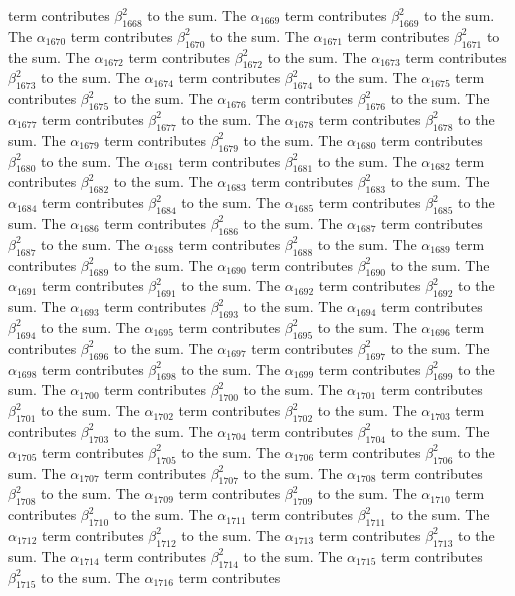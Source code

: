 \begin{lemma}
term contributes $\beta_{1668}^{2}$ to the sum. The $\alpha_{1669}$ term contributes $\beta_{1669}^{2}$ to the sum. The $\alpha_{1670}$ term contributes $\beta_{1670}^{2}$ to the sum. The $\alpha_{1671}$ term contributes $\beta_{1671}^{2}$ to the sum. The $\alpha_{1672}$ term contributes $\beta_{1672}^{2}$ to the sum. The $\alpha_{1673}$ term contributes $\beta_{1673}^{2}$ to the sum. The $\alpha_{1674}$ term contributes $\beta_{1674}^{2}$ to the sum. The $\alpha_{1675}$ term contributes $\beta_{1675}^{2}$ to the sum. The $\alpha_{1676}$ term contributes $\beta_{1676}^{2}$ to the sum. The $\alpha_{1677}$ term contributes $\beta_{1677}^{2}$ to the sum. The $\alpha_{1678}$ term contributes $\beta_{1678}^{2}$ to the sum. The $\alpha_{1679}$ term contributes $\beta_{1679}^{2}$ to the sum. The $\alpha_{1680}$ term contributes $\beta_{1680}^{2}$ to the sum. The $\alpha_{1681}$ term contributes $\beta_{1681}^{2}$ to the sum. The $\alpha_{1682}$ term contributes $\beta_{1682}^{2}$ to the sum. The $\alpha_{1683}$ term contributes $\beta_{1683}^{2}$ to the sum. The $\alpha_{1684}$ term contributes $\beta_{1684}^{2}$ to the sum. The $\alpha_{1685}$ term contributes $\beta_{1685}^{2}$ to the sum. The $\alpha_{1686}$ term contributes $\beta_{1686}^{2}$ to the sum. The $\alpha_{1687}$ term contributes $\beta_{1687}^{2}$ to the sum. The $\alpha_{1688}$ term contributes $\beta_{1688}^{2}$ to the sum. The $\alpha_{1689}$ term contributes $\beta_{1689}^{2}$ to the sum. The $\alpha_{1690}$ term contributes $\beta_{1690}^{2}$ to the sum. The $\alpha_{1691}$ term contributes $\beta_{1691}^{2}$ to the sum. The $\alpha_{1692}$ term contributes $\beta_{1692}^{2}$ to the sum. The $\alpha_{1693}$ term contributes $\beta_{1693}^{2}$ to the sum. The $\alpha_{1694}$ term contributes $\beta_{1694}^{2}$ to the sum. The $\alpha_{1695}$ term contributes $\beta_{1695}^{2}$ to the sum. The $\alpha_{1696}$ term contributes $\beta_{1696}^{2}$ to the sum. The $\alpha_{1697}$ term contributes $\beta_{1697}^{2}$ to the sum. The $\alpha_{1698}$ term contributes $\beta_{1698}^{2}$ to the sum. The $\alpha_{1699}$ term contributes $\beta_{1699}^{2}$ to the sum. The $\alpha_{1700}$ term contributes $\beta_{1700}^{2}$ to the sum. The $\alpha_{1701}$ term contributes $\beta_{1701}^{2}$ to the sum. The $\alpha_{1702}$ term contributes $\beta_{1702}^{2}$ to the sum. The $\alpha_{1703}$ term contributes $\beta_{1703}^{2}$ to the sum. The $\alpha_{1704}$ term contributes $\beta_{1704}^{2}$ to the sum. The $\alpha_{1705}$ term contributes $\beta_{1705}^{2}$ to the sum. The $\alpha_{1706}$ term contributes $\beta_{1706}^{2}$ to the sum. The $\alpha_{1707}$ term contributes $\beta_{1707}^{2}$ to the sum. The $\alpha_{1708}$ term contributes $\beta_{1708}^{2}$ to the sum. The $\alpha_{1709}$ term contributes $\beta_{1709}^{2}$ to the sum. The $\alpha_{1710}$ term contributes $\beta_{1710}^{2}$ to the sum. The $\alpha_{1711}$ term contributes $\beta_{1711}^{2}$ to the sum. The $\alpha_{1712}$ term contributes $\beta_{1712}^{2}$ to the sum. The $\alpha_{1713}$ term contributes $\beta_{1713}^{2}$ to the sum. The $\alpha_{1714}$ term contributes $\beta_{1714}^{2}$ to the sum. The $\alpha_{1715}$ term contributes $\beta_{1715}^{2}$ to the sum. The $\alpha_{1716}$ term contributes 
\end{lemma}
